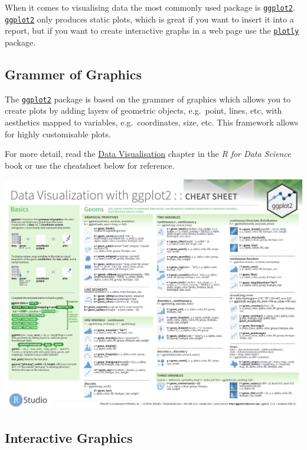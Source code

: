 \documentclass[]{book}
\begin{document}
When it comes to visualising data the most commonly used package is
\href{https://ggplot2.tidyverse.org/}{\texttt{ggplot2}}. \href{https://ggplot2.tidyverse.org/}{\texttt{ggplot2}}
only produces static plots, which is great if you want to insert it into a report, but if you want
to create interactive graphs in a web page use the \href{https://plot.ly/r/}{\texttt{plotly}} package.

\hypertarget{grammer-of-graphics}{%
\subsection{Grammer of Graphics}\label{grammer-of-graphics}}

The \href{https://ggplot2.tidyverse.org/}{\texttt{ggplot2}} package is based on the grammer of graphics which
allows you to create plots by adding layers of geometric objects, e.g.~point, lines, etc, with
aesthetics mapped to variables, e.g.~coordinates, size, etc. This framework allows for highly
customisable plots.

For more detail, read the \href{https://r4ds.had.co.nz/data-visualisation.html}{Data Visualisation}
chapter in the \emph{R for Data Science} book or use the cheatsheet below for reference.

\href{https://github.com/rstudio/cheatsheets/raw/master/data-visualization-2.1.pdf}{\includegraphics{images/ggplot2.png}}

\hypertarget{interactive-graphics}{%
\subsection{Interactive Graphics}\label{interactive-graphics}}
\end{document}
